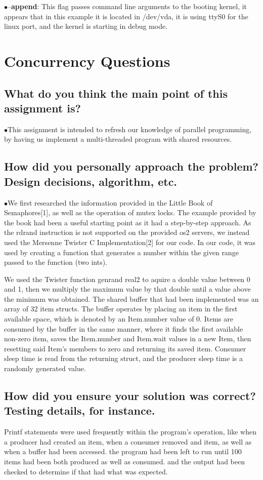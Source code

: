\documentclass[letterpaper,10pt,fleqn,draftclsnofoot,onecolumn]{IEEEtran}
\begin{document}
	$\bullet$--{\bf append}: This flag passes command line arguments to the booting kernel, it appears that in this example it is located in /dev/vda, it is using ttyS0 for the linux port, and the kernel is starting in debug mode.
	
	\section*{Concurrency Questions}
	\subsection{What do you think the main point of this assignment is?}
	$\bullet$This assignment is intended to refresh our knowledge of parallel programming, by having us implement a multi-threaded program with shared resources.
	
	\subsection{How did you personally approach the problem? Design decisions, algorithm, etc.}
	$\bullet$We first researched the information provided in the Little Book of Semaphores[1], as well as the operation of mutex locks. The example provided by the book had been a useful starting point as it had a step-by-step approach. As the rdrand instruction is not supported on the provided os2 servers, we instead used the Mersenne Twister C Implementation[2] for our code. In our code, it was used by creating a function that generates a number within the given range passed to the function (two ints).  
	
	We used the Twister function genrand real2 to aquire a double value between 0 and 1, then we multiply the maximum value by that double until a value above the minimum was obtained. The shared buffer that had been implemented was an array of 32 item structs. The buffer operates by placing an item in the first available space, which is denoted by an Item.number value of 0. Items are consumed by the buffer in the same manner, where it finds the first available non-zero item, saves the Item.number and Item.wait values in a new Item, then resetting said Item's members to zero and returning its saved item. Consumer sleep time is read from the returning struct, and the producer sleep time is a randomly generated value.
	
	\subsection{How did you ensure your solution was correct? Testing details, for instance.}
	Printf statements were used frequently within the program's operation, like when a producer had created an item, when a consumer removed and item, as well as when a buffer had been accessed. the program had been left to run until 100 items had been both produced as well as consumed. and the output had been checked to determine if that had what was expected.
	
\end{document}
